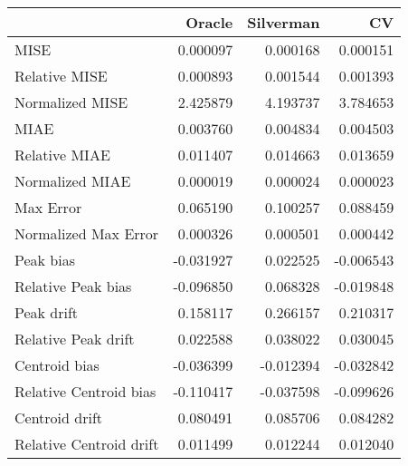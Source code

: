 \begin{tabular}{lrrr}
  \hline
 & Oracle & Silverman & CV \\ 
  \hline
MISE & 0.000097 & 0.000168 & 0.000151 \\ 
  Relative MISE & 0.000893 & 0.001544 & 0.001393 \\ 
  Normalized MISE & 2.425879 & 4.193737 & 3.784653 \\ 
  MIAE & 0.003760 & 0.004834 & 0.004503 \\ 
  Relative MIAE & 0.011407 & 0.014663 & 0.013659 \\ 
  Normalized MIAE & 0.000019 & 0.000024 & 0.000023 \\ 
  Max Error & 0.065190 & 0.100257 & 0.088459 \\ 
  Normalized Max Error & 0.000326 & 0.000501 & 0.000442 \\ 
  Peak bias & -0.031927 & 0.022525 & -0.006543 \\ 
  Relative Peak bias & -0.096850 & 0.068328 & -0.019848 \\ 
  Peak drift & 0.158117 & 0.266157 & 0.210317 \\ 
  Relative Peak drift & 0.022588 & 0.038022 & 0.030045 \\ 
  Centroid bias & -0.036399 & -0.012394 & -0.032842 \\ 
  Relative Centroid bias & -0.110417 & -0.037598 & -0.099626 \\ 
  Centroid drift & 0.080491 & 0.085706 & 0.084282 \\ 
  Relative Centroid drift & 0.011499 & 0.012244 & 0.012040 \\ 
   \hline
\end{tabular}
